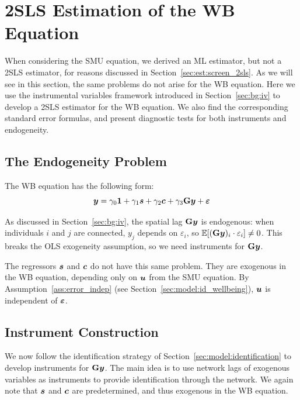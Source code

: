 \section{2SLS Estimation of the WB Equation}
\label{sec:est:wb_2sls}
When considering the SMU equation, we derived an ML estimator, but not a 2SLS estimator, for reasons discussed in Section~\ref{sec:est:screen_2sls}. As we will see in this section, the same problems do not arise for the WB equation. Here we use the instrumental variables framework introduced in Section~\ref{sec:bg:iv} to develop a 2SLS estimator for the WB equation. We also find the corresponding standard error formulas, and present diagnostic tests for both instruments and endogeneity.

\subsection{The Endogeneity Problem}

The WB equation has the following form:
\begin{equation}
    \bm{y} = \gamma_0\bm{1} + \gamma_1\bm{s} + \gamma_2\bm{c}
    + \gamma_3\mathbf{G}\bm{y} + \bm{\varepsilon}
\end{equation}

As discussed in Section~\ref{sec:bg:iv}, the spatial lag $\mathbf{G}\bm{y}$ is endogenous: when individuals $i$ and $j$ are connected, $y_j$ depends on $\varepsilon_i$, so $\mathbb{E}[(\mathbf{G}\bm{y})_i \cdot \varepsilon_i] \neq 0$. This breaks the OLS exogeneity assumption, so we need instruments for $\mathbf{G}\bm{y}$.

The regressors $\bm{s}$ and $\bm{c}$ do not have this same problem. They are exogenous in the WB equation, depending only on $\bm{u}$ from the SMU equation. By Assumption~\ref{ass:error_indep} (see Section~\ref{sec:model:id_wellbeing}), $\bm{u}$ is independent of $\bm{\varepsilon}$.

\subsection{Instrument Construction}
\label{sec:est:instruments}
We now follow the identification strategy of Section~\ref{sec:model:identification} to develop instruments for $\mathbf{G}\bm{y}$. The main idea is to use network lags of exogenous variables as instruments to provide identification through the network. We again note that $\bm{s}$ and $\bm{c}$ are predetermined, and thus exogenous in the WB equation.

